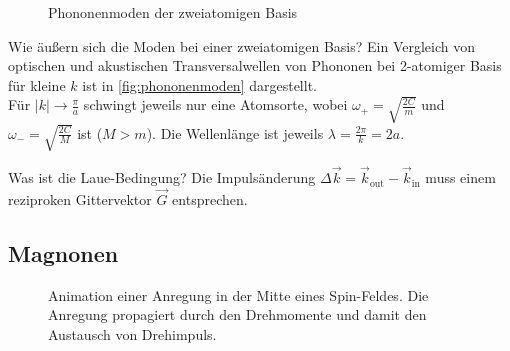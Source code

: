 \begin{figure}[ht!]
\begin{subfigure}[t]{0.48\linewidth}
    \end{subfigure}
    \caption{Phononenmoden der zweiatomigen Basis}
    \label{fig:phononenmoden}
\end{figure}


\begin{fquestion}{Wie äußern sich die Moden bei einer zweiatomigen Basis?}
    Ein Vergleich von optischen und akustischen Transversalwellen von Phononen bei 2-atomiger Basis für kleine $k$ ist in \autoref{fig:phononenmoden} dargestellt.
    \\
    Für $|k|\rightarrow \frac{\pi }{a}$ schwingt jeweils nur eine Atomsorte, wobei $\omega_+ = \sqrt{\frac{2C}{m}}$ und $\omega_- = \sqrt{\frac{2C}{M}}$ ist ($M > m$).
    Die Wellenlänge ist jeweils $\lambda = \frac{2\pi }{k} = 2a$.
\end{fquestion}

\begin{fquestion}{Was ist die Laue-Bedingung?}
    Die Impulsänderung $\Delta\Vec{k} = \Vec{k}_\mathrm{out} - \Vec{k}_\mathrm{in}$ muss einem reziproken Gittervektor $\Vec{G}$ entsprechen.
\end{fquestion}

\subsection{Magnonen}

\begin{figure}[ht!]
    \centering
    \caption{Animation einer Anregung in der Mitte eines Spin-Feldes. Die Anregung propagiert durch den Drehmomente und damit den Austausch von Drehimpuls.
    }
\end{figure}

